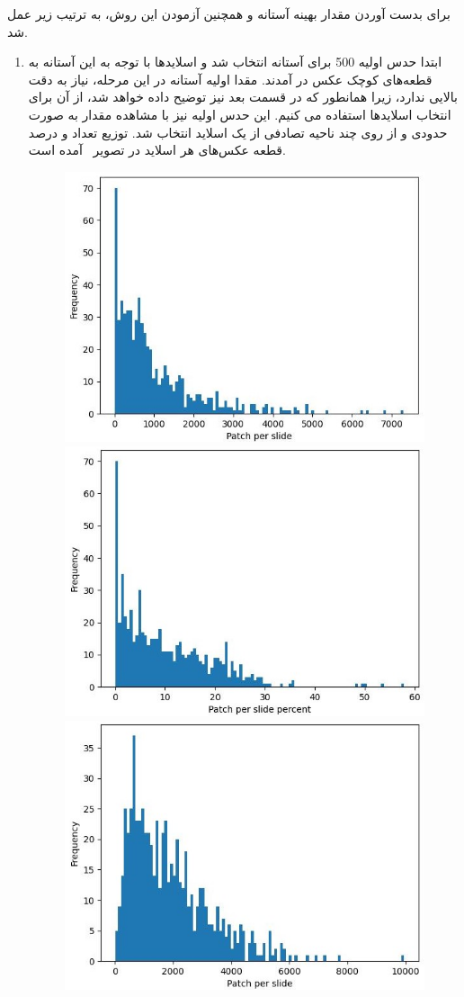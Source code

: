 برای بدست آوردن مقدار بهینه آستانه و همچنین آزمودن این روش، به ترتیب زیر عمل شد.
\begin{enumerate}
    \item ابتدا حدس اولیه 500 برای آستانه انتخاب شد و اسلاید‌ها با توجه به این آستانه به قطعه‌های کوچک عکس در آمدند.
    مقدا اولیه آستانه در این مرحله، نیاز به دقت بالایی ندارد، زیرا همانطور که در قسمت بعد نیز توضیح داده خواهد شد، از آن برای انتخاب اسلاید‌ها استفاده می کنیم.
    این حدس اولیه نیز با مشاهده مقدار به صورت حدودی و از روی چند ناحیه تصادفی از یک اسلاید انتخاب شد.
    توزیع تعداد و درصد قطعه عکس‌های هر اسلاید در تصویر~ آمده است.
    \begin{figure}
        \begin{center}
            \includegraphics[width=0.48\linewidth]{figs/introduction/subs/challenges/patch_distribution_old_500_threshold.jpeg}
            \includegraphics[width=0.48\linewidth]{figs/introduction/subs/challenges/patch_percent_distribution_old_threshold_500.jpeg}
            \hspace{.2cm}
            \includegraphics[width=0.48\linewidth]{figs/introduction/subs/challenges/patch_distribution_new_298_threshold.jpeg}

\end{center}
\end{figure}
\end{enumerate}
